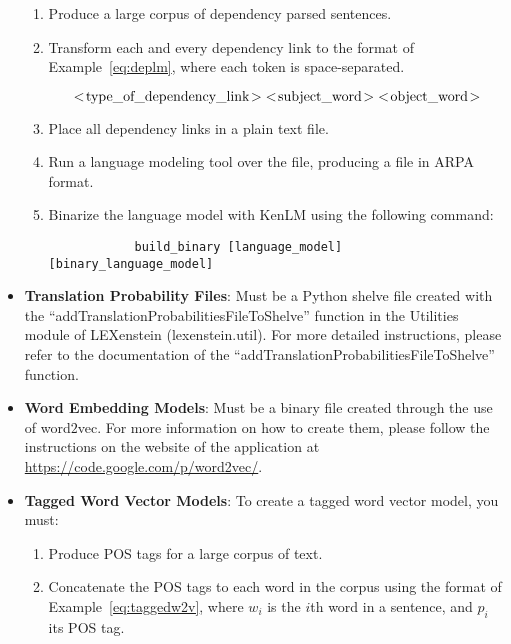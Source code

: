 \begin{itemize}
		\begin{enumerate}
			\item Produce a large corpus of dependency parsed sentences.
			\item Transform each and every dependency link to the format of Example~\ref{eq:deplm}, where each token is space-separated.
			
				\begin{equation}
				\label{eq:deplm}
				<\!\textup{type\_of\_dependency\_link}\!>\; <\!\textup{subject\_word}\!>\; <\!\textup{object\_word}\!>
				\end{equation}
				
			\item Place all dependency links in a plain text file.
			\item Run a language modeling tool over the file, producing a file in ARPA format.
			\item Binarize the language model with KenLM using the following command:
			
			\begin{lstlisting}
			build_binary [language_model] [binary_language_model]
			\end{lstlisting}
		\end{enumerate}
			
	\item \textbf{Translation Probability Files}: Must be a Python shelve file created with the ``addTranslationProbabilitiesFileToShelve'' function in the Utilities module of LEXenstein (lexenstein.util). For more detailed instructions, please refer to the documentation of the ``addTranslationProbabilitiesFileToShelve'' function.
	
	\item \textbf{Word Embedding Models}: Must be a binary file created through the use of word$2$vec. For more information on how to create them, please follow the instructions on the website of the application at \url{https://code.google.com/p/word2vec/}.
	
	\item \textbf{Tagged Word Vector Models}: To create a tagged word vector model, you must:
	
		\begin{enumerate}
			\item Produce POS tags for a large corpus of text.
			\item Concatenate the POS tags to each word in the corpus using the format of Example~\ref{eq:taggedw2v}, where $w_{i}$ is the $i$th word in a sentence, and $p_{i}$ its POS tag.
			

\end{enumerate}
\end{itemize}
